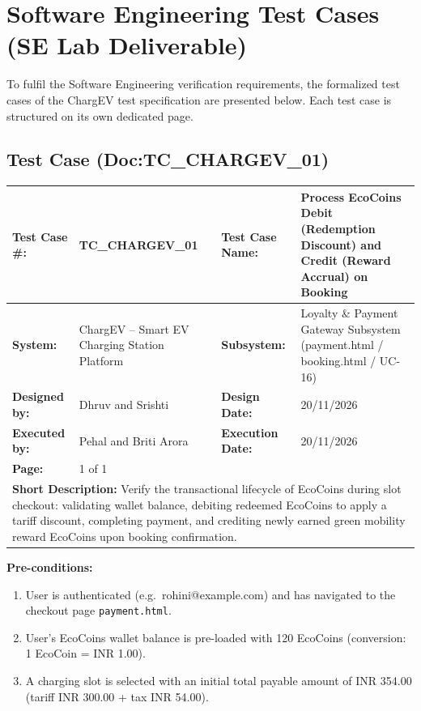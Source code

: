 \documentclass{tietreport}
\begin{document}
\section{Software Engineering Test Cases (SE Lab Deliverable)}

To fulfil the Software Engineering verification
requirements, the formalized test cases of the ChargEV test
specification are presented below. Each test case is
structured on its own dedicated page.

\clearpage
\subsection{Test Case (Doc:TC\_CHARGEV\_01)}
\label{sec:tc01}

\begin{center}
\footnotesize
\renewcommand{\arraystretch}{1.05}
\begin{tabularx}{\textwidth}{|p{2.8cm}|X|p{2.8cm}|X|}
\hline
\textbf{Test Case \#:} & TC\_CHARGEV\_01 & \textbf{Test Case Name:} & Process EcoCoins Debit (Redemption Discount) and Credit (Reward Accrual) on Booking \\
\hline
\textbf{System:} & ChargEV -- Smart EV Charging Station Platform & \textbf{Subsystem:} & Loyalty \& Payment Gateway Subsystem (payment.html / booking.html / UC-16) \\
\hline
\textbf{Designed by:} & Dhruv and Srishti & \textbf{Design Date:} & 20/11/2026 \\
\hline
\textbf{Executed by:} & Pehal and Briti Arora & \textbf{Execution Date:} & 20/11/2026 \\
\hline
\textbf{Page:} & 1 of 1 & & \\
\hline
\multicolumn{4}{|p{0.96\textwidth}|}{\textbf{Short Description:} \newline Verify the transactional lifecycle of EcoCoins during slot checkout: validating wallet balance, debiting redeemed EcoCoins to apply a tariff discount, completing payment, and crediting newly earned green mobility reward EcoCoins upon booking confirmation.} \\
\hline
\end{tabularx}
\end{center}

\vspace{-0.4em}
\noindent\textbf{Pre-conditions:}
\begin{enumerate}\footnotesize
    \setlength{\itemsep}{1pt}
    \setlength{\parskip}{0pt}
    \item User is authenticated (e.g.\ rohini@example.com) and has navigated to the checkout page \texttt{payment.html}.
    \item User's EcoCoins wallet balance is pre-loaded with 120 EcoCoins (conversion: 1 EcoCoin = INR 1.00).
    \item A charging slot is selected with an initial total payable amount of INR 354.00 (tariff INR 300.00 + tax INR 54.00).
\end{enumerate}
\end{document}
